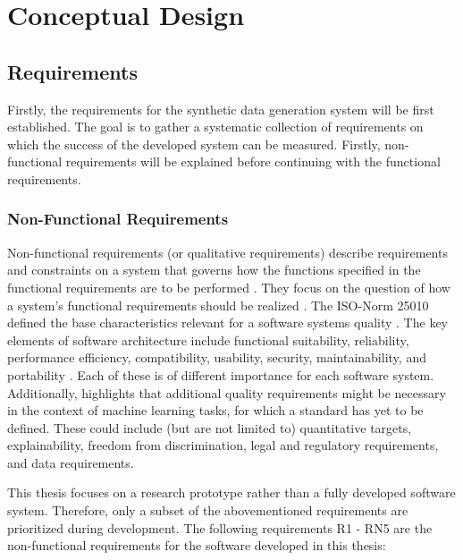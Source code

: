 \chapter{Conceptual Design}
\label{ch:conceptualDesign}

\section{Requirements}
\label{ch:requirements}

Firstly, the requirements for the synthetic data generation system will be first established.
The goal is to gather a systematic collection of requirements on which the success of the developed system can be measured.
Firstly, non-functional requirements will be explained before continuing with the functional requirements.


\subsection*{Non-Functional Requirements}

Non-functional requirements (or qualitative requirements) describe requirements and constraints on a system that governs how the functions specified in the functional requirements are to be performed \cite{broy2021EinfuehrungSoftwaretechnik}.
They focus on the question of how a system's functional requirements should be realized \cite{broy2021EinfuehrungSoftwaretechnik}.
The ISO-Norm 25010 \cite{iso/iecSystemsSoftwareEngineering} defined the base characteristics relevant for a software systems quality \cite{haoues2017GuidelineSoftwareArchitecture}.
The key elements of software architecture include functional suitability, reliability, performance efficiency, compatibility, usability, security, maintainability, and portability \cite{haoues2017GuidelineSoftwareArchitecture}.
Each of these is of different importance for each software system.
Additionally, \cite{vogelsang2019RequirementsEngineeringMachine} highlights that additional quality requirements might be necessary in the context of machine learning tasks, for which a standard has yet to be defined.
These could include (but are not limited to) quantitative targets, explainability, freedom from discrimination, legal and regulatory requirements, and data requirements.

This thesis focuses on a research prototype rather than a fully developed software system.
Therefore, only a subset of the abovementioned requirements are prioritized during development.
The following requirements R1 - RN5 are the non-functional requirements for the software developed in this thesis:


